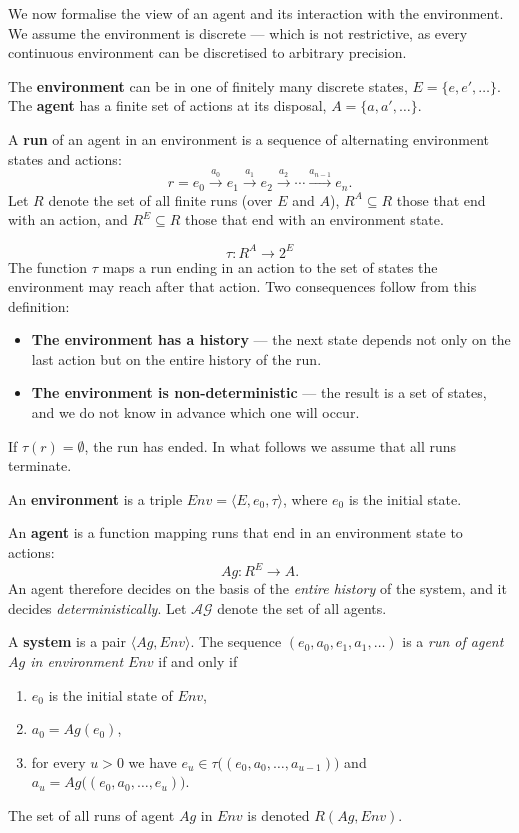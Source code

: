 \documentclass[11pt,a4paper]{article}
\theoremstyle{definition}
\begin{document}
We now formalise the view of an agent and its interaction with the environment. We assume the
environment is discrete --- which is not restrictive, as every continuous environment can be
discretised to arbitrary precision.

\begin{defbox}
The \textbf{environment} can be in one of finitely many discrete states,
$E = \{e, e', \dots\}$. The \textbf{agent} has a finite set of actions at its disposal,
$A = \{a, a', \dots\}$.

A \textbf{run} of an agent in an environment is a sequence of alternating environment states and
actions:
\[
r = e_0 \xrightarrow{a_0} e_1 \xrightarrow{a_1} e_2 \xrightarrow{a_2} \cdots
\xrightarrow{a_{n-1}} e_n .
\]
Let $R$ denote the set of all finite runs (over $E$ and $A$), $R^A \subseteq R$ those that end
with an action, and $R^E \subseteq R$ those that end with an environment state.
\end{defbox}

\begin{defbox}
\[
\tau : R^A \to 2^E
\]
The function $\tau$ maps a run ending in an action to the set of states the environment may reach
after that action. Two consequences follow from this definition:
\begin{itemize}
\item \textbf{The environment has a history} --- the next state depends not only on the last
  action but on the entire history of the run.
\item \textbf{The environment is non-deterministic} --- the result is a set of states, and we do
  not know in advance which one will occur.
\end{itemize}
If $\tau(r) = \emptyset$, the run has ended. In what follows we assume that all runs terminate.

An \textbf{environment} is a triple $\mathit{Env} = \langle E, e_0, \tau\rangle$, where $e_0$ is
the initial state.
\end{defbox}

\begin{defbox}
An \textbf{agent} is a function mapping runs that end in an environment state to actions:
\[
Ag : R^E \to A .
\]
An agent therefore decides on the basis of the \emph{entire history} of the system, and it decides
\emph{deterministically}. Let $\mathcal{AG}$ denote the set of all agents.

A \textbf{system} is a pair $\langle Ag, \mathit{Env}\rangle$. The sequence
$(e_0, a_0, e_1, a_1, \dots)$ is a \emph{run of agent $Ag$ in environment $\mathit{Env}$} if and
only if
\begin{enumerate}
\item $e_0$ is the initial state of $\mathit{Env}$,
\item $a_0 = Ag(e_0)$,
\item for every $u > 0$ we have $e_u \in \tau\big((e_0,a_0,\dots,a_{u-1})\big)$
  and $a_u = Ag\big((e_0,a_0,\dots,e_u)\big)$.
\end{enumerate}
The set of all runs of agent $Ag$ in $\mathit{Env}$ is denoted $R(Ag,\mathit{Env})$.
\end{defbox}
\end{document}

